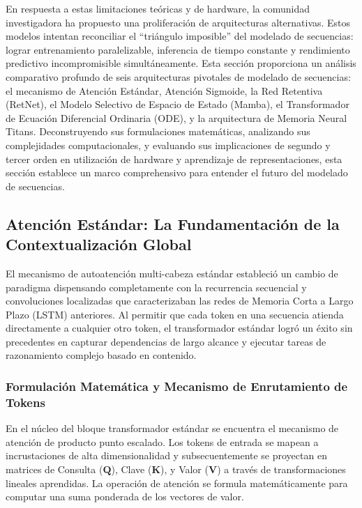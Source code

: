 \documentclass[11pt,a4paper]{article}
\begin{document}
En respuesta a estas limitaciones teóricas y de hardware, la comunidad investigadora ha propuesto una proliferación de arquitecturas alternativas. Estos modelos intentan reconciliar el ``triángulo imposible'' del modelado de secuencias: lograr entrenamiento paralelizable, inferencia de tiempo constante y rendimiento predictivo incompromisible simultáneamente. Esta sección proporciona un análisis comparativo profundo de seis arquitecturas pivotales de modelado de secuencias: el mecanismo de Atención Estándar, Atención Sigmoide, la Red Retentiva (RetNet), el Modelo Selectivo de Espacio de Estado (Mamba), el Transformador de Ecuación Diferencial Ordinaria (ODE), y la arquitectura de Memoria Neural Titans. Deconstruyendo sus formulaciones matemáticas, analizando sus complejidades computacionales, y evaluando sus implicaciones de segundo y tercer orden en utilización de hardware y aprendizaje de representaciones, esta sección establece un marco comprehensivo para entender el futuro del modelado de secuencias.

\subsection{Atención Estándar: La Fundamentación de la Contextualización Global}
\label{subsec:standard_attention}

El mecanismo de autoatención multi-cabeza estándar estableció un cambio de paradigma dispensando completamente con la recurrencia secuencial y convoluciones localizadas que caracterizaban las redes de Memoria Corta a Largo Plazo (LSTM) anteriores. Al permitir que cada token en una secuencia atienda directamente a cualquier otro token, el transformador estándar logró un éxito sin precedentes en capturar dependencias de largo alcance y ejecutar tareas de razonamiento complejo basado en contenido.

\subsubsection{Formulación Matemática y Mecanismo de Enrutamiento de Tokens}

En el núcleo del bloque transformador estándar se encuentra el mecanismo de atención de producto punto escalado. Los tokens de entrada se mapean a incrustaciones de alta dimensionalidad y subsecuentemente se proyectan en matrices de Consulta ($\mathbf{Q}$), Clave ($\mathbf{K}$), y Valor ($\mathbf{V}$) a través de transformaciones lineales aprendidas. La operación de atención se formula matemáticamente para computar una suma ponderada de los vectores de valor.
\end{document}
